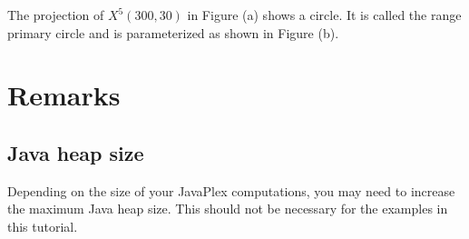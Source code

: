 \documentclass[amscd, amssymb, verbatim]{amsart}[12pt]
\theoremstyle{remark}
\theoremstyle{remark}
\theoremstyle{remark}
\begin{document}
\begin{figure}[htp]
  \begin{center}
    \quad
   \end{center}
\end{figure}
\FloatBarrier

The projection of $X^5(300,30)$ in Figure (a) shows a circle. It is called the range primary circle and is parameterized as shown in Figure (b).




\section{Remarks} 


\subsection{Java heap size}
Depending on the size of your JavaPlex computations, you may need to increase the maximum Java heap size. This should not be necessary for the examples in this tutorial.
\end{document}
